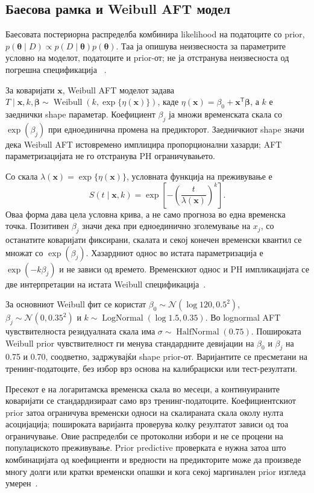 \documentclass[12pt]{article}
\begin{document}
\subsection{Баесова рамка и Weibull AFT модел}

Баесовата постериорна распределба комбинира likelihood на податоците со prior,
$p(\boldsymbol{\theta}\mid D)\propto p(D\mid\boldsymbol{\theta})p(\boldsymbol{\theta})$.
Таа ја опишува неизвесноста за параметрите условно на моделот, податоците и
prior-от; не ја отстранува неизвесноста од погрешна спецификација
~\cite{gelman2013}.

За коваријати $\mathbf{x}$, Weibull AFT моделот задава
$T\mid\mathbf{x},k,\boldsymbol{\beta}\sim\operatorname{Weibull}(k,\exp\{\eta(\mathbf{x})\})$,
каде $\eta(\mathbf{x})=\beta_0+\mathbf{x}^{\mathsf T}\boldsymbol{\beta}$,
а $k$ е заеднички shape параметар. Коефициент $\beta_j$ ја множи временската
скала со $\exp(\beta_j)$ при едноединична промена на предикторот. Заедничкиот
shape значи дека Weibull AFT истовремено имплицира пропорционални хазарди; AFT
параметризацијата не го отстранува PH ограничувањето.

Со скала $\lambda(\mathbf{x})=\exp\{\eta(\mathbf{x})\}$, условната функција
на преживување е
\[
S(t\mid\mathbf{x},k)=\exp\!\left[-\left(\frac{t}{\lambda(\mathbf{x})}\right)^k\right].
\]
Оваа форма дава цела условна крива, а не само прогноза во една временска точка.
Позитивен $\beta_j$ значи дека при едноединично зголемување на $x_j$, со
останатите коваријати фиксирани, скалата и секој конечен временски квантил се
множат со $\exp(\beta_j)$. Хазардниот однос во истата параметризација е
$\exp(-k\beta_j)$ и не зависи од времето. Временскиот однос и PH импликацијата
се две интерпретации на истата Weibull спецификација~\cite{kalbfleisch2002}.

За основниот Weibull фит се користат
$\beta_0\sim\mathcal{N}(\log 120,0.5^2)$,
$\beta_j\sim\mathcal{N}(0,0.35^2)$ и
$k\sim\operatorname{LogNormal}(\log 1.5,0.35)$. Во lognormal AFT
чувствителноста резидуалната скала има $\sigma\sim\operatorname{HalfNormal}(0.75)$.
Пошироката Weibull prior чувствителност ги менува стандардните девијации на
$\beta_0$ и $\beta_j$ на 0.75 и 0.70, соодветно, задржувајќи shape prior-от.
Варијантите се пресметани на тренинг-податоците, без избор врз основа на
калибрациски или тест-резултати.

Пресекот е на логаритамска временска скала во месеци, а континуираните
коваријати се стандардизираат само врз тренинг-податоците. Коефициентскиот prior
затоа ограничува временски односи на скалираната скала околу нулта асоцијација;
пошироката варијанта проверува колку резултатот зависи од тоа ограничување.
Овие распределби се протоколни избори и не се процени на популациското
преживување. Prior predictive проверката е нужна затоа што комбинацијата од
коефициенти и вредности на предикторите може да произведе многу долги или кратки
временски опашки и кога секој маргинален prior изгледа умерен~\cite{gelman2013}.
\end{document}
